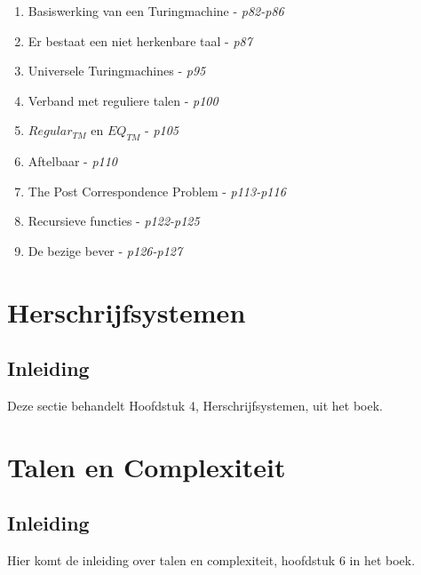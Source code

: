 \documentclass[10pt,a4paper]{article}
\begin{document}
\begin{enumerate}
	\item Basiswerking van een Turingmachine - \emph{p82-p86}
	\item Er bestaat een niet herkenbare taal - \emph{p87}
	\item Universele Turingmachines - \emph{p95}
	\item Verband met reguliere talen - \emph{p100}
	\item $Regular_{TM}$ en $EQ_{TM}$ - \emph{p105}
	\item Aftelbaar - \emph{p110}
	\item The Post Correspondence Problem - \emph{p113-p116}
	\item Recursieve functies - \emph{p122-p125}
	\item De bezige bever - \emph{p126-p127}
\end{enumerate}









\newpage
\section{Herschrijfsystemen}

\subsection{Inleiding}

Deze sectie behandelt Hoofdstuk 4, Herschrijfsystemen, uit het boek.





\newpage
\section{Talen en Complexiteit}

\subsection{Inleiding}

Hier komt de inleiding over talen en complexiteit, hoofdstuk 6 in het boek.


\end{document}
